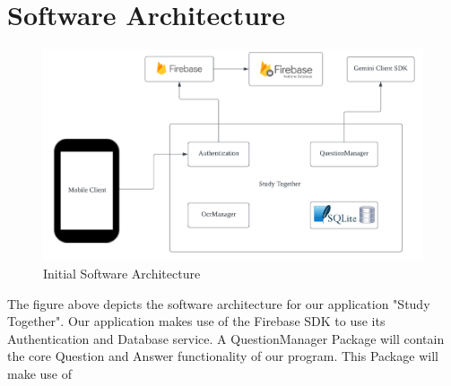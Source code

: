 \chapter{Software Architecture}\label{software_architecture}

\begin{figure}[h] %
       \centering
       \includegraphics[scale = .80]{Figures/StudyTogether_Architecture.png}
       \caption{\footnotesize Initial Software Architecture}
       \label{fig2}
\end{figure}

The figure above depicts the software architecture for our application "Study Together". Our application makes use of the Firebase SDK to use its Authentication and Database service. A QuestionManager Package will contain the core Question and Answer functionality of our program. This Package will make use of 
